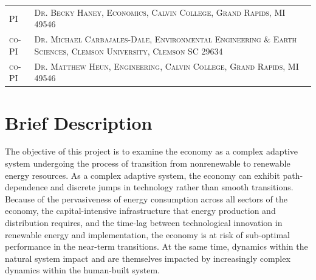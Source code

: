 \documentclass[11pt,a4paper]{article}
\begin{document}

\begin{table}
\begin{tabular}{lp{12cm}}
	\textsc{PI} & \textsc{Dr. Becky Haney, Economics, Calvin College, Grand Rapids, MI 49546}	\\
	\textsc{co-PI} & \textsc{Dr. Michael Carbajales-Dale, Environmental Engineering \& Earth Sciences, Clemson University, Clemson SC 29634} \\
	\textsc{co-PI} & \textsc{Dr. Matthew Heun, Engineering, Calvin College, Grand Rapids, MI 49546} \\
\end{tabular}
\end{table}
\section{Brief Description}
The objective of this project is to examine the economy as a complex 
adaptive system undergoing the process of transition from nonrenewable to renewable
energy resources. As a complex adaptive system, the economy can exhibit
path-dependence and discrete jumps in technology rather than smooth transitions.
Because of the pervasiveness of energy consumption across
all sectors of the economy, the capital-intensive infrastructure that energy production and distribution
requires, and the time-lag between technological innovation in renewable
energy and implementation, the economy is at risk of sub-optimal
performance in the near-term transitions. At the same time,
dynamics within the natural system impact and are themselves impacted by
increasingly complex dynamics within the human-built system.
\end{document}
